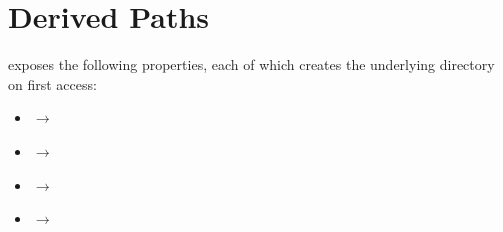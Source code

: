 \section*{Derived Paths}

 exposes the following properties, each of which
creates the underlying directory on first access:

\begin{itemize}[leftmargin=1.4em]
  \item {} $\to$ 
  \item {} $\to$ 
  \item {} $\to$ 
  \item {} $\to$ 
\end{itemize}

